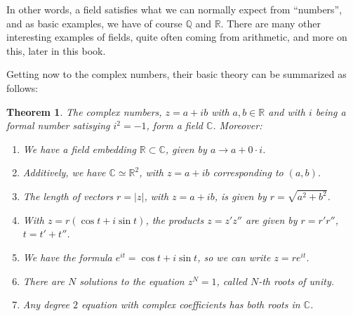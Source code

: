 \documentclass[12pt]{amsbook}
\newtheorem{theorem}{Theorem}[chapter]
\begin{document}
In other words, a field satisfies what we can normally expect from ``numbers'', and as basic examples, we have of course $\mathbb Q$ and $\mathbb R$. There are many other interesting examples of fields, quite often coming from arithmetic, and more on this, later in this book.

\bigskip

Getting now to the complex numbers, their basic theory can be summarized as follows:


\begin{theorem}
The complex numbers, $z=a+ib$ with $a,b\in\mathbb R$ and with $i$ being a formal number satisying $i^2=-1$, form a field $\mathbb C$. Moreover:
\begin{enumerate}
\item We have a field embedding $\mathbb R\subset\mathbb C$, given by $a\to a+0\cdot i$.

\item Additively, we have $\mathbb C\simeq\mathbb R^2$, with $z=a+ib$ corresponding to $(a,b)$.

\item The length of vectors $r=|z|$, with $z=a+ib$, is given by $r=\sqrt{a^2+b^2}$.

\item With $z=r(\cos t+i\sin t)$, the products $z=z'z''$ are given by $r=r'r''$, $t=t'+t''$.

\item We have the formula $e^{it}=\cos t+i\sin t$, so we can write $z=re^{it}$.

\item There are $N$ solutions to the equation $z^N=1$, called $N$-th roots of unity.

\item Any degree $2$ equation with complex coefficients has both roots in $\mathbb C$.
\end{enumerate}
\end{theorem}
\end{document}
